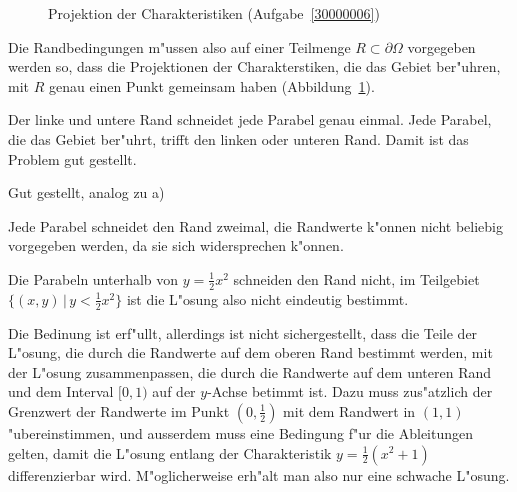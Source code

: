 \begin{loesung}
\begin{figure}
\begin{center}
\end{center}
\caption{Projektion der Charakteristiken (Aufgabe~\ref{30000006})
\label{30000006:char}}
\end{figure}
Die Randbedingungen m"ussen also auf einer Teilmenge $R\subset \partial\Omega$
vorgegeben werden so, dass die Projektionen der Charakterstiken, die das
Gebiet ber"uhren, mit $R$ genau einen Punkt gemeinsam haben (Abbildung~\ref{30000006:char}). 
\begin{teilaufgaben}
\item Der linke und untere Rand schneidet jede Parabel genau einmal. 
Jede Parabel, die das Gebiet ber"uhrt, trifft den linken oder unteren
Rand. Damit ist das Problem gut gestellt.
\item Gut gestellt, analog zu a)
\item Jede Parabel schneidet den Rand zweimal, die Randwerte k"onnen nicht
beliebig vorgegeben werden, da sie sich widersprechen k"onnen.
\item Die Parabeln unterhalb von $y=\frac12x^2$ schneiden den Rand
nicht, im Teilgebiet $\{(x,y)\,|\, y<\frac12x^2\}$ ist die L"osung also
nicht eindeutig bestimmt.
\item Die Bedinung ist erf"ullt, allerdings ist nicht sichergestellt,
dass die Teile der L"osung, die durch die Randwerte auf dem oberen 
Rand bestimmt werden, mit der L"osung zusammenpassen, die durch
die Randwerte auf dem unteren Rand und dem Interval $[0,1)$ auf
der $y$-Achse betimmt ist. Dazu muss zus"atzlich der Grenzwert
der Randwerte im Punkt $(0,\frac12)$ mit dem Randwert in $(1,1)$
"ubereinstimmen, und ausserdem muss eine Bedingung f"ur die Ableitungen
gelten, damit die L"osung entlang der Charakteristik $y=\frac12(x^2+1)$
differenzierbar wird. M"oglicherweise erh"alt man also nur eine
schwache L"osung.
\end{teilaufgaben}
\end{loesung}
